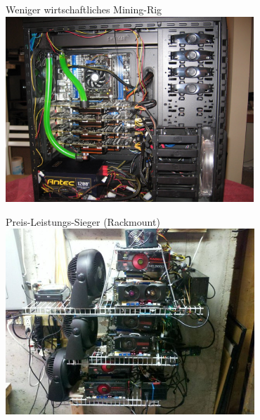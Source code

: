\documentclass[handout]{beamer} \usepackage[german]{babel}
\begin{document}
\begin{frame}{Weniger wirtschaftliches Mining-Rig}
\includegraphics[height=70mm]{btcvortrag/liquid-cool-mining-rig.JPG}
\end{frame}

\begin{frame}{Preis-Leistungs-Sieger (Rackmount)}
	\includegraphics[height=70mm]{btcvortrag/rack-mounted-mining.jpg}
\end{frame}

\end{document}

